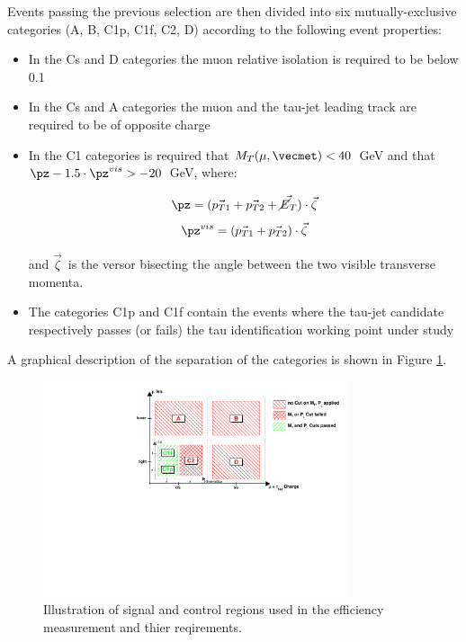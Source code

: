 Events passing the previous selection are then divided into six mutually-exclusive categories (A, B, C1p, C1f, C2, D) according to the following event properties:
\begin{itemize}
\item In the Cs and D categories the muon relative isolation is required to be below 0.1
\item In the Cs and A categories the muon and the tau-jet leading track are required to be of opposite charge
\item In the C1 categories is required that $M_T(\mu, \vecmet) < 40$\ GeV and that $\pz -1.5 \cdot \pz^{vis} > -20$\ GeV, where:

\begin{equation}
 \pz = (\vec{p_{T1}} + \vec{p_{T2}} + \vec{\cancel{E}_T}) \cdot \vec{\zeta}
\end{equation}
\begin{equation}
 \pz^{vis} = (\vec{p_{T1}} + \vec{p_{T2}}) \cdot \vec{\zeta}
\end{equation}

and $\vec{\zeta}$\ is the versor bisecting the angle between the two visible transverse momenta.
\item The categories C1p and C1f contain the events where the tau-jet candidate respectively passes (or fails) the tau identification working point under study
\end{itemize}

A graphical description of the separation of the categories is shown in Figure \ref{fig:tau_eff_ABCD}.

\begin{figure}
\begin{center}
\includegraphics[angle=-0,width=0.8\textwidth]{3_Evt_Reconstruction/pics/figTauIdEffIllustration.pdf}
\caption{Illustration of signal and control regions used in the efficiency measurement and thier reqirements.
\label{fig:tau_eff_ABCD}
}
\end{center}
\end{figure}

